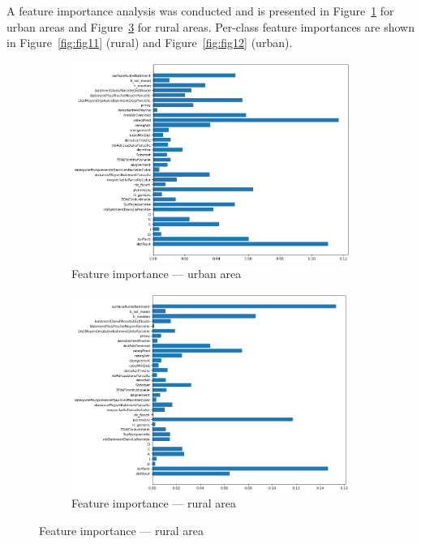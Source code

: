\documentclass[11pt]{article}
\begin{document}
A feature importance analysis was conducted and is presented in Figure~\ref{fig:fig9} for urban areas and Figure~\ref{fig:fig10} for rural areas. Per-class feature importances are shown in Figure~\ref{fig:fig11} (rural) and Figure~\ref{fig:fig12} (urban).

\begin{figure}[H]
\centering
\begin{subfigure}{0.48\textwidth}
    \centering
    \includegraphics[width=\linewidth]{fig9.png}
    \caption{Feature importance — urban area}
    \label{fig:fig9}
\end{subfigure}%
\hfill
\begin{subfigure}{0.48\textwidth}
    \centering
    \includegraphics[width=\linewidth]{fig10.png}
    \caption{Feature importance — rural area}
    \label{fig:fig10}
\end{subfigure}


\end{figure}
\end{document}
